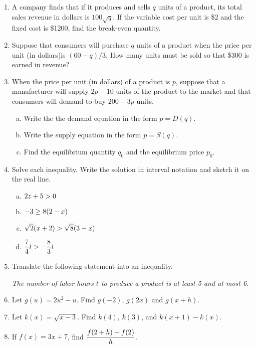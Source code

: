 \documentclass[11pt]{exam}
\begin{document}
\begin{enumerate}
\item A company finds that if it produces and sells $q$ units of a product, its total sales revenue in dollars is $100\sqrt{q}$.  If the variable cost per unit is \$2 and the fixed cost is \$1200, find the break-even quantity.

\item Suppose that consumers will purchase $q$ units of a product when the price per unit (in dollars)is $(60 - q)/3$.  How many units must be sold so that \$300 is earned in revenue?

\item When the price per unit (in dollars) of a product is $p$, suppose that a manufacturer will supply $2p - 10$ units of the product to the market and that consumers will demand to buy $200 - 3p$ units.
\begin{enumerate}[(a)]
\item Write the the demand equation in the form $p = D(q)$.
\item Write the supply equation in the form $p = S(q)$.
\item Find the equilibrium quantity $q_{0}$ and the equilibrium price $p_{0}$.
\end{enumerate}

\item Solve each inequality.  Write the solution in interval notation and sketch it on the real line.
\begin{enumerate}[(a)]
\item $\displaystyle{2z + 5 > 0}$
\item $\displaystyle{-3\geq 8(2 - x)}$
\item $\displaystyle{\sqrt{2}(x + 2) > \sqrt{8}(3 - x)}$
\item $\displaystyle{\frac{7}{4}t > -\frac{8}{3}t}$
\end{enumerate}

\item Translate the following statement into an inequality.
\begin{center}
\textit{The number of labor hours $t$ to produce a product is at least 5 and at most 6.}
\end{center}

\item Let $g(u) = 2u^2 - u$.  Find $g(-2)$, $g(2x)$ and $g(x + h)$.
\item Let $k(x) = \sqrt{x - 3}$.  Find $k(4)$, $k(3)$, and $k(x+1) - k(x)$.
\item If $f(x) = 3x + 7$, find $\displaystyle{\frac{f(2 + h) - f(2)}{h}}$.


\end{enumerate}
\end{document}
